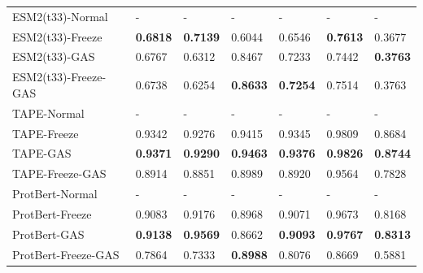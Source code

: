 \begin{table}[h]
{\begin{tabular}{lllllll}
		ESM2(t33)-Normal            & -                 & -                  & -               & -                 & -               & -               \\
		ESM2(t33)-Freeze     & \textbf{0.6818}   & \textbf{0.7139}    & 0.6044          & 0.6546            & \textbf{0.7613} & 0.3677          \\
		ESM2(t33)-GAS        & 0.6767            & 0.6312             & 0.8467          & 0.7233            & 0.7442          & \textbf{0.3763} \\
		ESM2(t33)-Freeze-GAS & 0.6738            & 0.6254             & \textbf{0.8633} & \textbf{0.7254}   & 0.7514          & 0.3763          \\ \midrule
		TAPE-Normal                 & -                 & -                  & -               & -                 & -               & -               \\
		TAPE-Freeze          & 0.9342            & 0.9276             & 0.9415          & 0.9345            & 0.9809          & 0.8684          \\
		TAPE-GAS             & \textbf{0.9371}   & \textbf{0.9290}    & \textbf{0.9463} & \textbf{0.9376}   & \textbf{0.9826} & \textbf{0.8744} \\
		TAPE-Freeze-GAS      & 0.8914            & 0.8851             & 0.8989          & 0.8920            & 0.9564          & 0.7828          \\ \midrule
		ProtBert-Normal             & -                 & -                  & -               & -                 & -               & -               \\
		ProtBert-Freeze      & 0.9083            & 0.9176             & 0.8968          & 0.9071            & 0.9673          & 0.8168          \\
		ProtBert-GAS         & \textbf{0.9138}   & \textbf{0.9569}    & 0.8662          & \textbf{0.9093}   & \textbf{0.9767} & \textbf{0.8313} \\
		ProtBert-Freeze-GAS  & 0.7864            & 0.7333             & \textbf{0.8988} & 0.8076            & 0.8669          & 0.5881         \\ 
	\end{tabular}}
\end{table}

\clearpage

